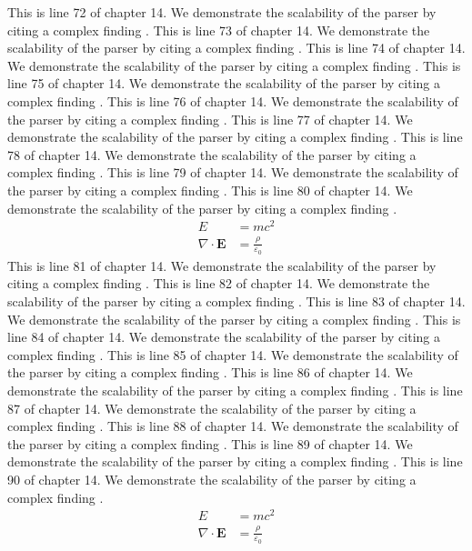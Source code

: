 This is line 72 of chapter 14. We demonstrate the scalability of the parser by citing a complex finding \cite{ref14_72}.
This is line 73 of chapter 14. We demonstrate the scalability of the parser by citing a complex finding \cite{ref14_73}.
This is line 74 of chapter 14. We demonstrate the scalability of the parser by citing a complex finding \cite{ref14_74}.
This is line 75 of chapter 14. We demonstrate the scalability of the parser by citing a complex finding \cite{ref14_75}.
This is line 76 of chapter 14. We demonstrate the scalability of the parser by citing a complex finding \cite{ref14_76}.
This is line 77 of chapter 14. We demonstrate the scalability of the parser by citing a complex finding \cite{ref14_77}.
This is line 78 of chapter 14. We demonstrate the scalability of the parser by citing a complex finding \cite{ref14_78}.
This is line 79 of chapter 14. We demonstrate the scalability of the parser by citing a complex finding \cite{ref14_79}.
This is line 80 of chapter 14. We demonstrate the scalability of the parser by citing a complex finding \cite{ref14_80}.
\begin{align*}
  E &= mc^2 \\
  \nabla \cdot \mathbf{E} &= \frac{\rho}{\varepsilon_0}
\end{align*}
This is line 81 of chapter 14. We demonstrate the scalability of the parser by citing a complex finding \cite{ref14_81}.
This is line 82 of chapter 14. We demonstrate the scalability of the parser by citing a complex finding \cite{ref14_82}.
This is line 83 of chapter 14. We demonstrate the scalability of the parser by citing a complex finding \cite{ref14_83}.
This is line 84 of chapter 14. We demonstrate the scalability of the parser by citing a complex finding \cite{ref14_84}.
This is line 85 of chapter 14. We demonstrate the scalability of the parser by citing a complex finding \cite{ref14_85}.
This is line 86 of chapter 14. We demonstrate the scalability of the parser by citing a complex finding \cite{ref14_86}.
This is line 87 of chapter 14. We demonstrate the scalability of the parser by citing a complex finding \cite{ref14_87}.
This is line 88 of chapter 14. We demonstrate the scalability of the parser by citing a complex finding \cite{ref14_88}.
This is line 89 of chapter 14. We demonstrate the scalability of the parser by citing a complex finding \cite{ref14_89}.
This is line 90 of chapter 14. We demonstrate the scalability of the parser by citing a complex finding \cite{ref14_90}.
\begin{align*}
  E &= mc^2 \\
  \nabla \cdot \mathbf{E} &= \frac{\rho}{\varepsilon_0}
\end{align*}
